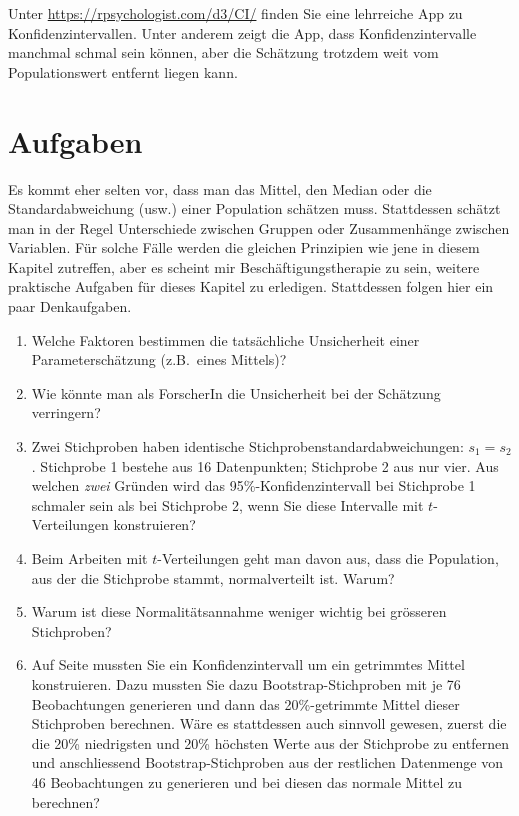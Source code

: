 \documentclass[oneside, 10pt]{book}\usepackage[]{graphicx}\usepackage[]{xcolor}
\begin{document}
Unter \url{https://rpsychologist.com/d3/CI/} finden Sie
eine lehrreiche App zu Konfidenzintervallen. Unter anderem
zeigt die App, dass Konfidenzintervalle manchmal schmal
sein können, aber die Schätzung trotzdem weit
vom Populationswert entfernt liegen kann.

\section{Aufgaben}
Es kommt eher selten vor, dass man das Mittel, den Median
oder die Standardabweichung (usw.) einer Population schätzen muss.
Stattdessen schätzt man in der Regel Unterschiede zwischen Gruppen
oder Zusammenhänge zwischen Variablen. Für solche Fälle werden
die gleichen Prinzipien wie jene in diesem Kapitel zutreffen,
aber es scheint mir Beschäftigungstherapie zu sein, weitere praktische
Aufgaben für dieses Kapitel zu erledigen. Stattdessen folgen
hier ein paar Denkaufgaben.

\begin{enumerate}
 \item Welche Faktoren bestimmen die tatsächliche Unsicherheit
 einer Parameterschätzung (z.B.\ eines Mittels)?

 \item Wie könnte man als ForscherIn die Unsicherheit bei der
 Schätzung verringern?

  \item Zwei Stichproben haben identische Stichprobenstandardabweichungen:
 $s_1 = s_2$. Stichprobe 1 bestehe aus 16 Datenpunkten; Stichprobe 2 aus nur vier.
 Aus welchen \emph{zwei} Gründen wird das 95\%-Konfidenzintervall
 bei Stichprobe 1 schmaler sein als bei Stichprobe 2, wenn Sie
 diese Intervalle mit $t$-Verteilungen konstruieren?

 \item Beim Arbeiten mit $t$-Verteilungen geht man davon aus,
 dass die Population, aus der die Stichprobe stammt, normalverteilt ist.
 Warum?

 \item Warum ist diese Normalitätsannahme weniger wichtig bei
 grösseren Stichproben?

 \item Auf Seite \pageref{par:trimmed} mussten Sie ein Konfidenzintervall um ein getrimmtes Mittel konstruieren.
 Dazu mussten Sie dazu Bootstrap-Stichproben mit je 76 Beobachtungen
 generieren und dann das 20\%-getrimmte Mittel dieser Stichproben berechnen.
 Wäre es stattdessen auch sinnvoll gewesen, zuerst die
 die 20\% niedrigsten und 20\% höchsten Werte aus der Stichprobe zu entfernen
 und anschliessend Bootstrap-Stichproben aus der restlichen Datenmenge von 46
 Beobachtungen zu generieren und bei diesen das normale Mittel zu berechnen?

\end{enumerate}
\end{document}
